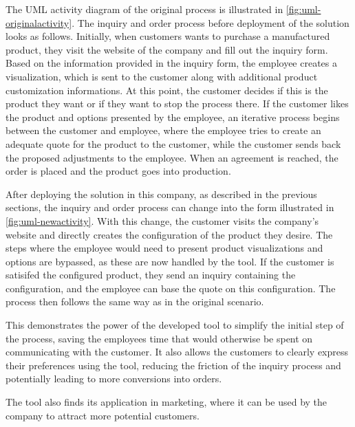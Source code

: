 The UML activity diagram of the original process is illustrated in \autoref{fig:uml-originalactivity}. The inquiry and order process before deployment of the solution looks as follows. Initially, when customers wants to purchase a manufactured product, they visit the website of the company and fill out the inquiry form. Based on the information provided in the inquiry form, the employee creates a visualization, which is sent to the customer along with additional product customization informations. At this point, the customer decides if this is the product they want or if they want to stop the process there. If the customer likes the product and options presented by the employee, an iterative process begins between the customer and employee, where the employee tries to create an adequate quote for the product to the customer, while the customer sends back the proposed adjustments to the employee. When an agreement is reached, the order is placed and the product goes into production. 

After deploying the solution in this company, as described in the previous sections, the inquiry and order process can change into the form illustrated in \autoref{fig:uml-newactivity}. With this change, the customer visits the company's website and directly creates the configuration of the product they desire. The steps where the employee would need to present product visualizations and options are bypassed, as these are now handled by the tool. If the customer is satisifed the configured product, they send an inquiry containing the configuration, and the employee can base the quote on this configuration. The process then follows the same way as in the original scenario.

This demonstrates the power of the developed tool to simplify the initial step of the process, saving the employees time that would otherwise be spent on communicating with the customer. It also allows the customers to clearly express their preferences using the tool, reducing the friction of the inquiry process and potentially leading to more conversions into orders.

The tool also finds its application in marketing, where it can be used by the company to attract more potential customers.

